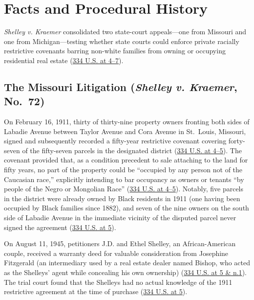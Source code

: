 \documentclass[12pt]{article}
\begin{document}
\section{Facts and Procedural History}

\textit{Shelley v. Kraemer} consolidated two state-court appeals---one from Missouri and one from Michigan---testing whether state courts could enforce private racially restrictive covenants barring non-white families from owning or occupying residential real estate (\href{https://supreme.justia.com/cases/federal/us/334/1/}{334 U.S. at 4--7}).

\subsection{The Missouri Litigation (\textit{Shelley v. Kraemer}, No.~72)}
On February 16, 1911, thirty of thirty-nine property owners fronting both sides of Labadie Avenue between Taylor Avenue and Cora Avenue in St.~Louis, Missouri, signed and subsequently recorded a fifty-year restrictive covenant covering forty-seven of the fifty-seven parcels in the designated district (\href{https://supreme.justia.com/cases/federal/us/334/1/}{334 U.S. at 4--5}). The covenant provided that, as a condition precedent to sale attaching to the land for fifty years, no part of the property could be ``occupied by any person not of the Caucasian race,'' explicitly intending to bar occupancy as owners or tenants ``by people of the Negro or Mongolian Race'' (\href{https://supreme.justia.com/cases/federal/us/334/1/}{334 U.S. at 4--5}). Notably, five parcels in the district were already owned by Black residents in 1911 (one having been occupied by Black families since 1882), and seven of the nine owners on the south side of Labadie Avenue in the immediate vicinity of the disputed parcel never signed the agreement (\href{https://supreme.justia.com/cases/federal/us/334/1/}{334 U.S. at 5}).

On August 11, 1945, petitioners J.D. and Ethel Shelley, an African-American couple, received a warranty deed for valuable consideration from Josephine Fitzgerald (an intermediary used by a real estate dealer named Bishop, who acted as the Shelleys' agent while concealing his own ownership) (\href{https://supreme.justia.com/cases/federal/us/334/1/}{334 U.S. at 5 \& n.1}). The trial court found that the Shelleys had no actual knowledge of the 1911 restrictive agreement at the time of purchase (\href{https://supreme.justia.com/cases/federal/us/334/1/}{334 U.S. at 5}).
\end{document}
